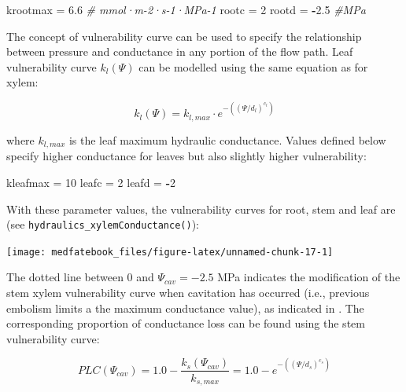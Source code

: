 \documentclass[]{book}
\newenvironment{Shaded}{\begin{snugshade}}{\end{snugshade}}
\newcommand{\DecValTok}[1]{\textcolor[rgb]{0.00,0.00,0.81}{#1}}
\newcommand{\FloatTok}[1]{\textcolor[rgb]{0.00,0.00,0.81}{#1}}
\newcommand{\StringTok}[1]{\textcolor[rgb]{0.31,0.60,0.02}{#1}}
\newcommand{\CommentTok}[1]{\textcolor[rgb]{0.56,0.35,0.01}{\textit{#1}}}
\newcommand{\OperatorTok}[1]{\textcolor[rgb]{0.81,0.36,0.00}{\textbf{#1}}}
\newcommand{\NormalTok}[1]{#1}
\begin{document}
\begin{Shaded}
\begin{Highlighting}[]
\NormalTok{krootmax =}\StringTok{ }\FloatTok{6.6} \CommentTok{# mmol·m-2·s-1·MPa-1}
\NormalTok{rootc =}\StringTok{ }\DecValTok{2}
\NormalTok{rootd =}\StringTok{ }\OperatorTok{-}\FloatTok{2.5} \CommentTok{#MPa}
\end{Highlighting}
\end{Shaded}

The concept of vulnerability curve can be used to specify the
relationship between pressure and conductance in any portion of the flow
path. Leaf vulnerability curve \(k_l(\Psi)\) can be modelled using the
same equation as for xylem:

\begin{equation}
k_l(\Psi) = k_{l,max}\cdot e^{-((\Psi/d_l)^{c_l})}
\label{eq:leafvulnerability}
\end{equation}

where \(k_{l,max}\) is the leaf maximum hydraulic conductance. Values
defined below specify higher conductance for leaves but also slightly
higher vulnerability:

\begin{Shaded}
\begin{Highlighting}[]
\NormalTok{kleafmax =}\StringTok{ }\DecValTok{10}
\NormalTok{leafc =}\StringTok{ }\DecValTok{2}
\NormalTok{leafd =}\StringTok{ }\OperatorTok{-}\DecValTok{2}
\end{Highlighting}
\end{Shaded}

With these parameter values, the vulnerability curves for root, stem and
leaf are (see \texttt{hydraulics\_xylemConductance()}):

\begin{center}\texttt{[image: medfatebook\_files/figure-latex/unnamed-chunk-17-1]} \end{center}

The dotted line between 0 and \(\Psi_{cav} = -2.5\) MPa indicates the
modification of the stem xylem vulnerability curve when cavitation has
occurred (i.e., previous embolism limits a the maximum conductance
value), as indicated in \citet{Sperry2016}. The corresponding proportion
of conductance loss can be found using the stem vulnerability curve:

\begin{equation}
PLC(\Psi_{cav}) = 1.0 - \frac{k_s(\Psi_{cav})}{k_{s,max}} = 1.0 - e^{-((\Psi/{d_s})^{c_s})}
\end{equation}
\end{document}
